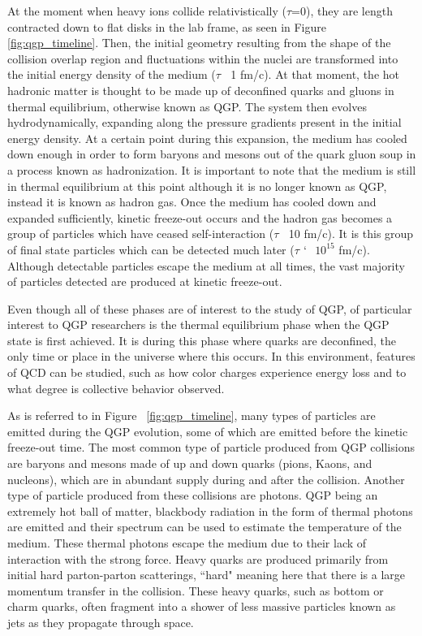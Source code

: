 At the moment when heavy ions collide relativistically ($\tau$=0), they are length contracted down to flat disks in the lab frame, as seen in Figure \ref{fig:qgp_timeline}. Then, the initial geometry resulting from the shape of the collision overlap region and fluctuations within the nuclei are transformed into the initial energy density of the medium ($\tau$ $~$ 1 fm/c). At that moment, the hot hadronic matter is thought to be made up of deconfined quarks and gluons in thermal equilibrium, otherwise known as QGP. The system then evolves hydrodynamically, expanding along the pressure gradients present in the initial energy density. At a certain point during this expansion, the medium has cooled down enough in order to form baryons and mesons out of the quark gluon soup in a process known as hadronization. It is important to note that the medium is still in thermal equilibrium at this point although it is no longer known as QGP, instead it is known as hadron gas. Once the medium has cooled down and expanded sufficiently, kinetic freeze-out occurs and the hadron gas becomes a group of particles which have ceased self-interaction ($\tau$ $~$ 10 fm/c). It is this group of final state particles which can be detected much later ($\tau$ $`~$ $10^{15}$ fm/c). Although detectable particles escape the medium at all times, the vast majority of particles detected are produced at kinetic freeze-out. 

Even though all of these phases are of interest to the study of QGP, of particular interest to QGP researchers is the thermal equilibrium phase when the QGP state is first achieved. It is during this phase where quarks are deconfined, the only time or place in the universe where this occurs. In this environment, features of QCD can be studied, such as how color charges experience energy loss and to what degree is collective behavior observed. 

As is referred to in Figure ~\ref{fig:qgp_timeline}, many types of particles are emitted during the QGP evolution, some of which are emitted before the kinetic freeze-out time. The most common type of particle produced from QGP collisions are baryons and mesons made of up and down quarks (pions, Kaons, and nucleons), which are in abundant supply during and after the collision. Another type of particle produced from these collisions are photons. QGP being an extremely hot ball of matter, blackbody radiation in the form of thermal photons are emitted and their spectrum can be used to estimate the temperature of the medium. These thermal photons escape the medium due to their lack of interaction with the strong force. Heavy quarks are produced primarily from initial hard parton-parton scatterings, ``hard" meaning here that there is a large momentum transfer in the collision. These heavy quarks, such as bottom or charm quarks, often fragment into a shower of less massive particles known as jets as they propagate through space.

